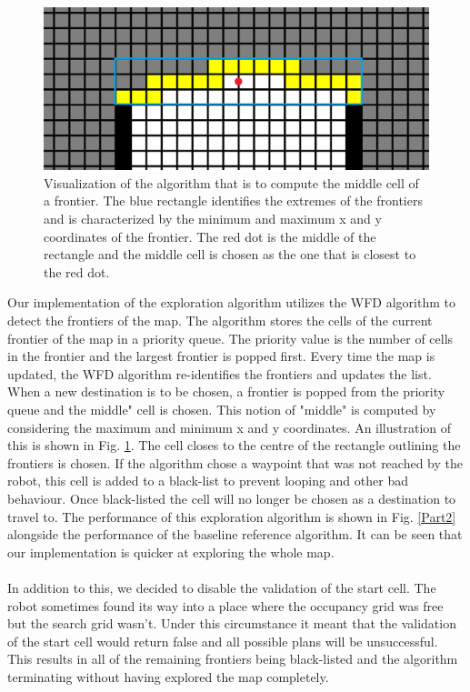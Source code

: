 \documentclass[a4paper,12pt]{article}
\begin{document}
				\begin{figure}[H]
					\centering
					\includegraphics[scale=0.25]{images/middleCellVisualization.png}
					\caption{Visualization of the algorithm that is to compute the middle cell of a frontier. The blue rectangle identifies the extremes of the frontiers and is characterized by the minimum and maximum x and y coordinates of the frontier. The red dot is the middle of the rectangle and the middle cell is chosen as the one that is closest to the red dot.}
					\label{middleCellVisualization}
				\end{figure}

				Our implementation of the exploration algorithm utilizes the WFD algorithm to detect the frontiers of the map. The algorithm stores the cells of the current frontier of the map in a priority queue. The priority value is the number of cells in the frontier and the largest frontier is popped first. Every time the map is updated, the WFD algorithm re-identifies the frontiers and updates the list. When a new destination is to be chosen, a frontier is popped from the priority queue and the middle" cell is chosen. This notion of "middle" is computed by considering the maximum and minimum x and y coordinates. An illustration of this is shown in Fig. \ref{middleCellVisualization}. The cell closes to the centre of the rectangle outlining the frontiers is chosen. If the algorithm chose a waypoint that was not reached by the robot, this cell is added to a black-list to prevent looping and other bad behaviour. Once black-listed the cell will no longer be chosen as a destination to travel to. The performance of this exploration algorithm is shown in Fig. \ref{Part2} alongside the performance of the baseline reference algorithm. It can be seen that our implementation is quicker at exploring the whole map. 
				\\
				\\
				In addition to this, we decided to disable the validation of the start cell. The robot sometimes found its way into a place where the occupancy grid was free but the search grid wasn't. Under this circumstance it meant that the validation of the start cell would return false and all possible plans will be unsuccessful. This results in all of the remaining frontiers being black-listed and the algorithm terminating without having explored the map completely. 
\end{document}

